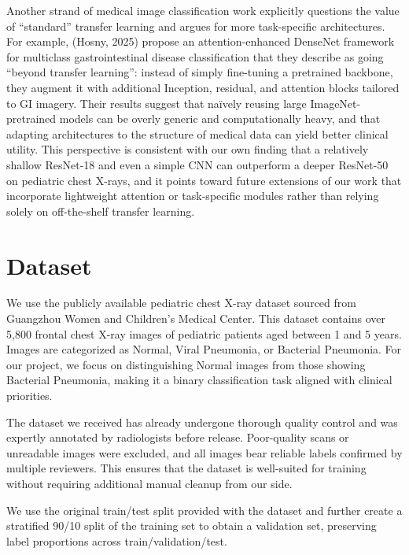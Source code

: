 \documentclass[11pt]{article}
\begin{document}
Another strand of medical image classification work explicitly questions the value of “standard” transfer learning and argues for more task-specific architectures. For example, (Hosny, 2025) propose an attention-enhanced DenseNet framework for multiclass gastrointestinal disease classification that they describe as going “beyond transfer learning”: instead of simply fine-tuning a pretrained backbone, they augment it with additional Inception, residual, and attention blocks tailored to GI imagery. Their results suggest that naïvely reusing large ImageNet-pretrained models can be overly generic and computationally heavy, and that adapting architectures to the structure of medical data can yield better clinical utility. This perspective is consistent with our own finding that a relatively shallow ResNet-18 and even a simple CNN can outperform a deeper ResNet-50 on pediatric chest X-rays, and it points toward future extensions of our work that incorporate lightweight attention or task-specific modules rather than relying solely on off-the-shelf transfer learning.

\section{Dataset}


We use the publicly available pediatric chest X-ray dataset sourced from Guangzhou Women and Children’s Medical Center. This dataset contains over 5,800 frontal chest X-ray images of pediatric patients aged between 1 and 5 years. Images are categorized as Normal, Viral Pneumonia, or Bacterial Pneumonia. For our project, we focus on distinguishing Normal images from those showing Bacterial Pneumonia, making it a binary classification task aligned with clinical priorities.

The dataset we received has already undergone thorough quality control and was expertly annotated by radiologists before release. Poor-quality scans or unreadable images were excluded, and all images bear reliable labels confirmed by multiple reviewers. This ensures that the dataset is well-suited for training without requiring additional manual cleanup from our side.

We use the original train/test split provided with the dataset and further create a stratified 90/10 split of the training set to obtain a validation set, preserving label proportions across train/validation/test.
\end{document}
